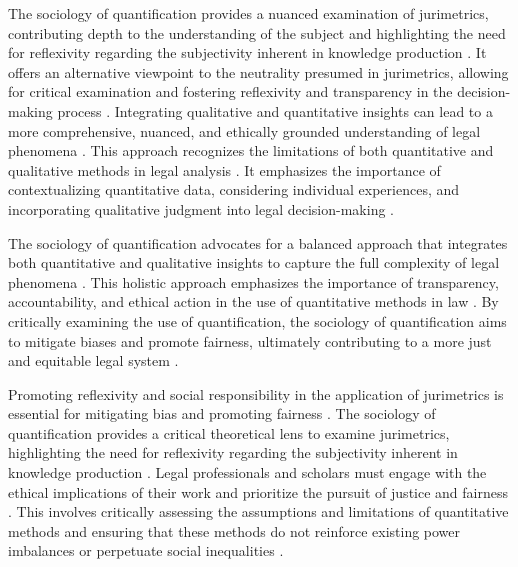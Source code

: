 The sociology of quantification provides a nuanced examination of jurimetrics, contributing depth to the understanding of the subject and highlighting the need for reflexivity regarding the subjectivity inherent in knowledge production \cite{10.1590/data.2022.65.3.267,10.32586/rcda.v18i1.585}. It offers an alternative viewpoint to the neutrality presumed in jurimetrics, allowing for critical examination and fostering reflexivity and transparency in the decision-making process \cite{10.1590/data.2022.65.3.267,10.32586/rcda.v18i1.585}. Integrating qualitative and quantitative insights can lead to a more comprehensive, nuanced, and ethically grounded understanding of legal phenomena \cite{10.1590/data.2022.65.3.267,10.32586/rcda.v18i1.585}. This approach recognizes the limitations of both quantitative and qualitative methods in legal analysis \cite{10.1590/data.2022.65.3.267,10.32586/rcda.v18i1.585}. It emphasizes the importance of contextualizing quantitative data, considering individual experiences, and incorporating qualitative judgment into legal decision-making \cite{10.1590/data.2022.65.3.267,10.32586/rcda.v18i1.585}.

The sociology of quantification advocates for a balanced approach that integrates both quantitative and qualitative insights to capture the full complexity of legal phenomena \cite{10.1007/s11186-021-09453-1, demortain2019politics}. This holistic approach emphasizes the importance of transparency, accountability, and ethical action in the use of quantitative methods in law \cite{10.1007/s11186-021-09453-1, demortain2019politics}. By critically examining the use of quantification, the sociology of quantification aims to mitigate biases and promote fairness, ultimately contributing to a more just and equitable legal system \cite{10.1007/s11186-021-09453-1, demortain2019politics}.

Promoting reflexivity and social responsibility in the application of jurimetrics is essential for mitigating bias and promoting fairness \cite{10.1007/s11186-021-09453-1,10.5040/9781350220645}. The sociology of quantification provides a critical theoretical lens to examine jurimetrics, highlighting the need for reflexivity regarding the subjectivity inherent in knowledge production \cite{10.1007/s11186-021-09453-1,10.5040/9781350220645}. Legal professionals and scholars must engage with the ethical implications of their work and prioritize the pursuit of justice and fairness \cite{10.1007/s11186-021-09453-1,10.5040/9781350220645}. This involves critically assessing the assumptions and limitations of quantitative methods and ensuring that these methods do not reinforce existing power imbalances or perpetuate social inequalities \cite{10.1007/s11186-021-09453-1,10.5040/9781350220645}.


